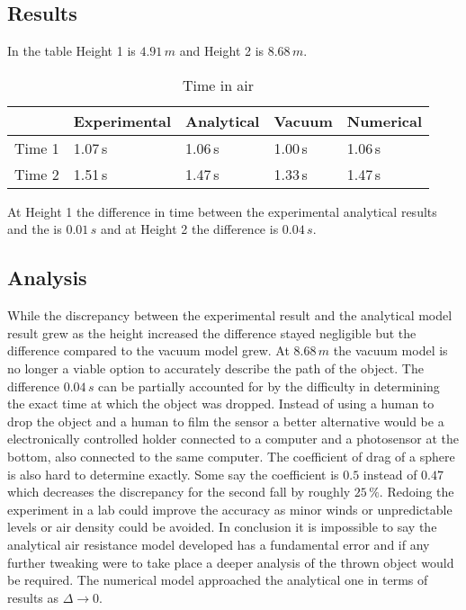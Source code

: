 \documentclass[%
aip,
jmp,
amsmath,amssymb,
reprint,%
]{revtex4-1}
\newcommand\Tstrut{\rule{0pt}{2.6ex}}
\newcommand\Bstrut{\rule[-0.9ex]{0pt}{0pt}}
\newcommand{\TBstrut}{\Tstrut\Bstrut}
\begin{document}
	\subsection{Results}
	In the table Height 1 is $4.91\,m$ and Height 2 is $8.68\,m$.
	\begin{table}[H]
		\centering
		\caption{Time in air}
		\label{table-3-label}
		\begin{tabular}{@{}lllll@{}}
			\hline
			& Experimental & Analytical & Vacuum & Numerical \TBstrut\\
			\hline
			Time 1 & 1.07\,s        & 1.06\,s      & 1.00\,s  & 1.06\,s    \TBstrut\\
			Time 2 & 1.51\,s        & 1.47\,s      & 1.33\,s  & 1.47\,s     \TBstrut\\ \hline
		\end{tabular}
	\end{table}
	At Height 1 the difference in time between the experimental analytical results and the is $0.01\,s$ and at Height 2 the difference is $0.04\,s$.
	\subsection{Analysis}
	While the discrepancy between the experimental result and the analytical model result grew as the height increased the difference stayed negligible but the difference compared to the vacuum model grew. At $8.68\,m$ the vacuum model is no longer a viable option to accurately describe the path of the object. The difference $0.04\,s$ can be partially accounted for by the difficulty in determining the exact time at which the object was dropped. Instead of using a human to drop the object and a human to film the sensor a better alternative would be a electronically controlled holder connected to a computer and a photosensor at the bottom, also connected to the same computer. The coefficient of drag of a sphere is also hard to determine exactly. Some\cite{c_d} say the coefficient is $0.5$ instead of $0.47$ which decreases the discrepancy for the second fall by roughly $25\,\%$. Redoing the experiment in a lab could improve the accuracy as minor winds or unpredictable levels or air density could be avoided. In conclusion it is impossible to say the analytical air resistance model developed has a fundamental error and if any further tweaking were to take place a deeper analysis of the thrown object would be required. The numerical model approached the analytical one in terms of results as $\Delta \rightarrow 0$.
\end{document}
